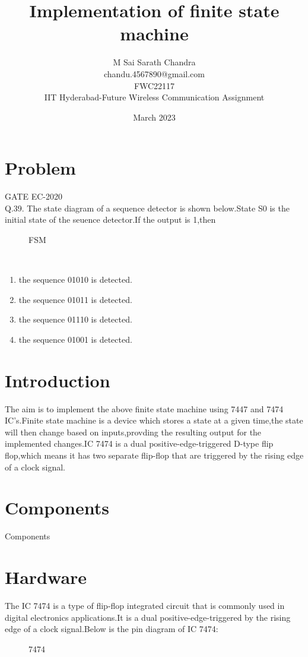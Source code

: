 \documentclass{article}
\title{Implementation of finite state machine}
\date{March 2023}
\author{M Sai Sarath Chandra\\chandu.4567890@gmail.com\\FWC22117\\IIT Hyderabad-Future Wireless Communication Assignment}
\begin{document}
\maketitle
	\tableofcontents

\pagebreak
\section{Problem}
	{GATE EC-2020}\\
	Q.39. The state diagram of a sequence detector is shown below.State S0 is the initial state of the seuence detector.If the output is 1,then 
\\
\begin{figure}[h]
	\centering

	\caption{FSM}
	\label{fig:1}
\end{figure}
\\
\begin{enumerate}
	\item the sequence 01010 is detected.
	\item the sequence 01011 is detected.
	\item the sequence 01110 is detected.
	\item the sequence 01001 is detected.
\end{enumerate}

\section{Introduction}
		The aim is to implement the above finite state machine using 7447 and 7474 IC's.Finite state machine is a device which stores a state at a given time,the state will then change based on inputs,provding the resulting output for the implemented changes.IC 7474 is a dual positive-edge-triggered D-type flip flop,which means it has two separate flip-flop that are triggered by the rising edge of a clock signal.

\section{Components}
	\begin{table}[h]
		\begin{center}
			
			\caption{Components}
			\label{table:1}
		\end{center}
	\end{table}
\pagebreak

\section{Hardware}
	The IC 7474 is a type of flip-flop integrated circuit that is commonly used in digital electronics applications.It is a dual positive-edge-triggered by the rising edge of a clock signal.Below is the pin diagram of IC 7474:
	\begin{figure}[h]
		\centering
		
			\caption{7474}
			\label{fig:2}
		\end{figure}
\end{document}
